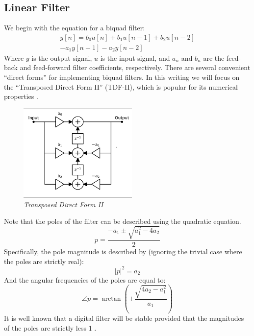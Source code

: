 \documentclass[twoside,a4paper]{article}
\begin{document}
\subsection{Linear Filter}
%
We begin with the equation for a biquad filter:
%
\begin{equation}
\begin{split}
    y[n] = b_0 u[n] + b_1 u[n-1] + b_2 u[n-2] \\ - a_1 y[n-1] - a_2 y[n-2]
\end{split}
    \label{eq:bq}
\end{equation}
%
Where $y$ is the output signal, $u$ is the input signal, and $a_n$ and $b_n$
are the feed-back and feed-forward filter coefficients, respectively.
There are several convenient ``direct forms'' for implementing biquad filters.
In this writing we will focus on the ``Transposed Direct Form II'' (TDF-II),
which is popular for its numerical properties \cite{JOSFilters}.
%
\begin{figure}[ht]
    \center
    \includegraphics[width=2.3in]{../Pics/TDF-II-White.png}
    \caption{\label{TDF-II}{\it Transposed Direct Form II}}
\end{figure}
%
Note that the poles of the filter can be described using the quadratic
equation.
\begin{equation}
    p = \frac{-a_1 \pm \sqrt{a_1^2- 4a_2}}{2}
    \label{eq:poles_lin}
\end{equation}
%
Specifically, the pole magnitude is described by (ignoring the
trivial case where the poles are strictly real):
\begin{equation}
    |p|^2 = a_2
    \label{eq:poles_lin_mag}
\end{equation}
%
And the angular frequencies of the poles are equal to:
\begin{equation}
    \angle p = \arctan \left( \pm \frac{\sqrt{4a_2 - a_1^2}}{a_1} \right)
    \label{eq:poles_lin_angle}
\end{equation}
%
It is well known that a digital filter will be stable provided that
the magnitudes of the poles are strictly less 1 \cite{JOSFilters}.
\newline
%
\end{document}
